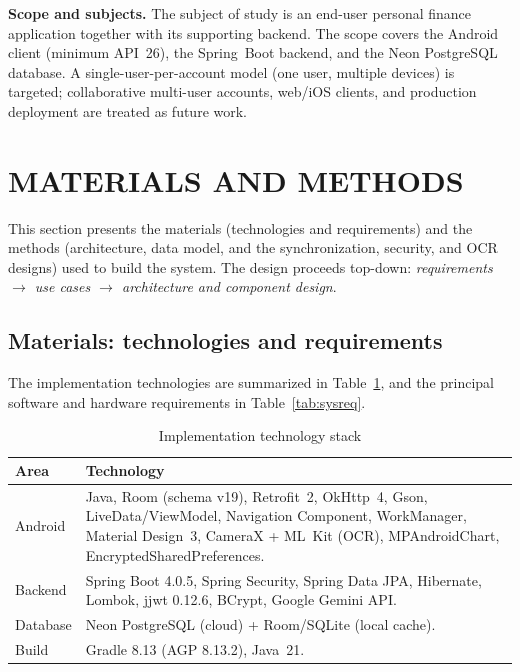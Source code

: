 \documentclass[13pt,a4paper]{extarticle}
\begin{document}
\noindent\textbf{Scope and subjects.} The subject of study is an end-user personal finance
application together with its supporting backend. The scope covers the Android client (minimum
API~26), the Spring~Boot backend, and the Neon PostgreSQL database. A single-user-per-account model
(one user, multiple devices) is targeted; collaborative multi-user accounts, web/iOS clients, and
production deployment are treated as future work.

\section{MATERIALS AND METHODS}

This section presents the materials (technologies and requirements) and the methods (architecture,
data model, and the synchronization, security, and OCR designs) used to build the system. The
design proceeds top-down: \emph{requirements $\rightarrow$ use cases $\rightarrow$ architecture and
component design}.

\subsection{Materials: technologies and requirements}
The implementation technologies are summarized in Table~\ref{tab:stack}, and the principal software
and hardware requirements in Table~\ref{tab:sysreq}.

\begin{table}[H]
\centering
\caption{Implementation technology stack}
\label{tab:stack}
\renewcommand{\arraystretch}{1.2}
\begin{tabularx}{\textwidth}{@{}l X@{}}
\toprule
\textbf{Area} & \textbf{Technology} \\
\midrule
Android  & Java, Room (schema v19), Retrofit~2, OkHttp~4, Gson, LiveData/ViewModel, Navigation Component, WorkManager, Material Design~3, CameraX + ML~Kit (OCR), MPAndroidChart, EncryptedSharedPreferences. \\
Backend  & Spring Boot 4.0.5, Spring Security, Spring Data JPA, Hibernate, Lombok, jjwt 0.12.6, BCrypt, Google Gemini API. \\
Database & Neon PostgreSQL (cloud) + Room/SQLite (local cache). \\
Build    & Gradle 8.13 (AGP 8.13.2), Java~21. \\
\bottomrule
\end{tabularx}
\end{table}
\end{document}
